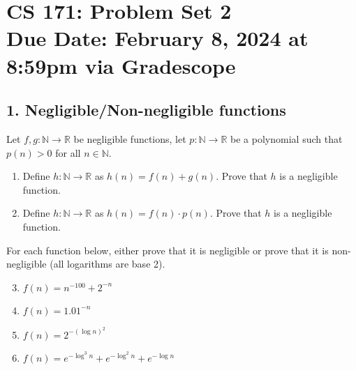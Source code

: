 \documentclass[11pt]{article}
\newcommand{\NN}{\mathbb{N}}
\newcommand{\RR}{\mathbb{R}}
\newcommand{\duedate}{February 8, 2024 at 8:59pm via Gradescope}
\begin{document}
\section*{CS 171: Problem Set 2\\ {\small Due Date: \duedate} }

\subsection*{1. Negligible/Non-negligible functions}
Let $f, g: \NN \rightarrow \RR$ be negligible functions, let $p: \NN \rightarrow \RR$ be a polynomial such that $p(n) > 0$ for all $n\in \NN$. 
\begin{enumerate}[label=(\alph*)] 
\item Define $h:\NN \rightarrow \RR$ as $h(n) =f(n)+g(n)$. Prove that $h$ is a negligible function.
\item Define $h:\NN \rightarrow \RR$ as $h(n) =f(n)\cdot p(n)$. Prove that $h$ is a negligible function.
\end{enumerate}
For each function below, either prove that it is negligible or prove that it is non-negligible (all logarithms are base 2).
\begin{enumerate}[label=(\alph*)] 
\setcounter{enumi}{2}
\item $f(n) = n^{-100} + 2^{-n}$
\item $f(n) = 1.01^{-n}$
\item $f(n) = 2^{-(\log n)^2}$
\item $f(n) = e^{-\log^3 n} + e^{-\log^2 n} + e^{-\log n}$
\end{enumerate}
\end{document}
